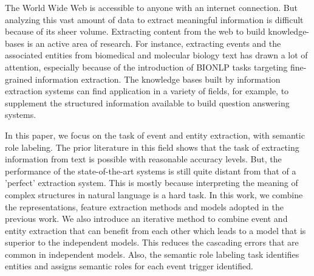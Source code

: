 The World Wide Web is accessible to anyone with an internet connection. But analyzing this vast amount of data to extract meaningful information is difficult because of its sheer volume. Extracting content from the web to build knowledge-bases is an active area of research. For instance, extracting events and the associated entities from biomedical and molecular biology text has drawn a lot of attention, especially because of the introduction of BIONLP tasks targeting fine-grained information extraction.  The knowledge bases built by information extraction systems can find application in a variety of fields, for example, to supplement the structured information available to build question answering systems.

In this paper, we focus on the task of event and entity extraction, with semantic role labeling. The prior literature in this field shows that the task of extracting information from text is possible with reasonable accuracy levels.  But, the performance of the state-of-the-art systems is still quite distant from that of a ’perfect’ extraction system. This is mostly because interpreting the meaning of complex structures in natural language is a hard task. In this work, we combine the representations, feature extraction methods and models adopted in the previous work. We also introduce an iterative method to combine event and entity extraction that can benefit from each other which leads to a model that is superior to the independent models. This reduces the cascading errors that are common in independent models. Also, the semantic role labeling task identifies entities and assigns semantic roles for each event trigger identified.